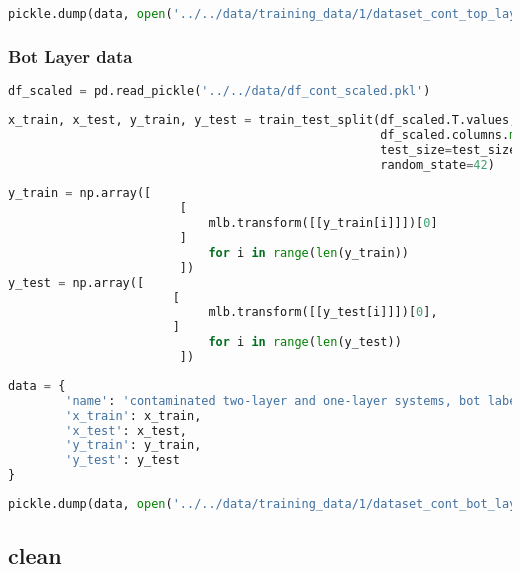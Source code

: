 \begin{lstlisting}[language=Python]
pickle.dump(data, open('../../data/training_data/1/dataset_cont_top_layer.pkl', 'wb'))
\end{lstlisting}

\hypertarget{bot-layer-data-1}{%
\subsubsection*{Bot Layer data}\label{bot-layer-data-1}}

\begin{lstlisting}[language=Python]
df_scaled = pd.read_pickle('../../data/df_cont_scaled.pkl')
\end{lstlisting}

\begin{lstlisting}[language=Python]
x_train, x_test, y_train, y_test = train_test_split(df_scaled.T.values,
                                                    df_scaled.columns.map(lambda x: x.split('_')[1]), # second part of the filename is the bot label
                                                    test_size=test_size_ratio,
                                                    random_state=42)
\end{lstlisting}

\begin{lstlisting}[language=Python]
y_train = np.array([    
                        [
                            mlb.transform([[y_train[i]]])[0]
                        ] 
                            for i in range(len(y_train))
                        ])
y_test = np.array([ 
                       [
                            mlb.transform([[y_test[i]]])[0],
                       ] 
                            for i in range(len(y_test))
                        ])
\end{lstlisting}

\begin{lstlisting}[language=Python]
data = {
        'name': 'contaminated two-layer and one-layer systems, bot labels',
        'x_train': x_train,
        'x_test': x_test,
        'y_train': y_train,
        'y_test': y_test
}
\end{lstlisting}

\begin{lstlisting}[language=Python]
pickle.dump(data, open('../../data/training_data/1/dataset_cont_bot_layer.pkl', 'wb'))
\end{lstlisting}

\hypertarget{clean}{%
\subsection*{clean}\label{clean}}

